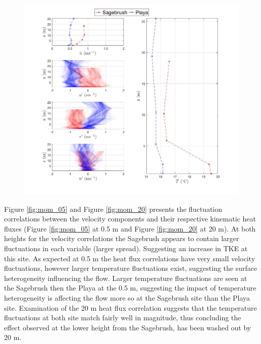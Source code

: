 \documentclass[]{article}
\begin{document}
\begin{figure}
	\centering
	\includegraphics[width=\textwidth]{u_T}
	\caption{}
	\label{fig:u_T}
\end{figure}
Figure \ref{fig:mom_05} and Figure \ref{fig:mom_20} presents the fluctuation correlations between the velocity components and their respective kinematic heat fluxes (Figure \ref{fig:mom_05} at 0.5 m and Figure \ref{fig:mom_20} at 20 m). At both heights for the velocity correlations the Sagebrush appears to contain larger fluctuations in each variable (larger spread). Suggesting an increase in TKE at this site. As expected at 0.5 m the heat flux correlations have very small velocity fluctuations, however larger temperature fluctuations exist, suggesting the surface heterogeneity influencing the flow. Larger temperature fluctuations are seen at the Sagebrush then the Playa at the 0.5 m, suggesting the impact of temperature heterogeneity is affecting the flow more so at the Sagebrush site than the Playa site. Examination of the 20 m heat flux correlation suggests that the temperature fluctuations at both site match fairly well in magnitude, thus concluding the effect observed at the lower height from the Sagebrush, has been washed out by 20 m. 
\end{document}
